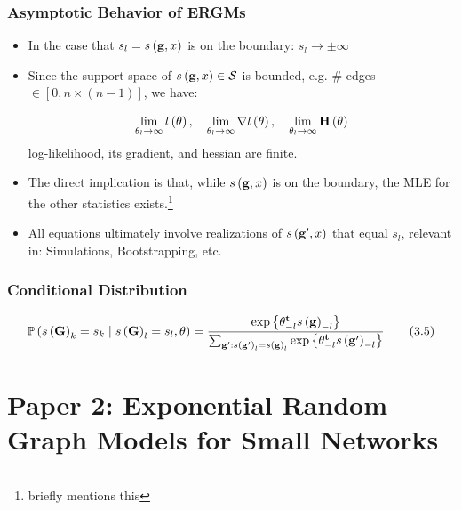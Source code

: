 \documentclass[aspectratio=169, 9pt]{beamer}
\begin{document}
\begin{frame}
\frametitle{Asymptotic Behavior of ERGMs}

\begin{itemize}
\item In the case that $s_l = s\left(\mathbf{g}, x\right)$ is on the boundary: $s_l \to \pm\infty$
\item Since the support space of $s\left(\mathbf{g}, x\right)\in\mathcal{S}$ is bounded, e.g. \# edges $\in [0,n\times (n - 1)]$, we have: 

\begin{equation*}
\lim_{\theta_l\to\infty}\loglik{\theta}, \quad %
\lim_{\theta_l\to\infty}\nabla\loglik{\theta}, \quad %
\lim_{\theta_l\to\infty}\mathbf{H}\left(\theta\right)
\end{equation*}
log-likelihood, its gradient, and hessian are finite.
\item The direct implication is that, while $s\left(\mathbf{g}, x\right)$ is on the boundary, the MLE for the other statistics exists.\footnote{\cite{Handcock2003} briefly mentions this}
\item All equations ultimately involve realizations of $s\left(\mathbf{g}', x\right)$ that equal $s_l$, relevant in: Simulations, Bootstrapping, etc.
\end{itemize}


\end{frame}

\begin{frame}
\frametitle{Conditional Distribution}

\begin{equation*}
\Prcond{\sufstats{\Graph}_k = s_k}{\sufstats{\Graph}_l = s_l, \theta} = %
\frac{%
	\exp{\transpose{\theta}_{-l}\sufstats{\graph}_{-l}}
}{%
	\sum_{\graph': \sufstats{\graph'}_l = \sufstats{\graph}_l}\exp{\transpose{\theta}_{-l}\sufstats{\graph'}_{-l}}
}\tag{3.5}
\end{equation*}


\end{frame}

\section{Paper 2: Exponential Random Graph Models for Small Networks}

\end{document}
